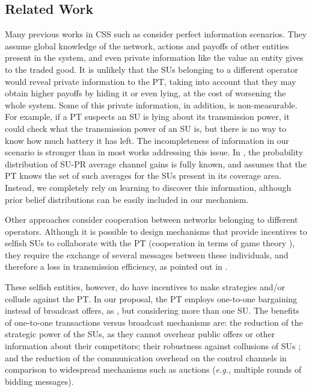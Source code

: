\subsection{Related Work}\label{sec:Rel}
Many previous works in CSS such as \cite{ref:Simeone2008,ref:Zhang2009,ref:Yi2010,ref:Nadkar2011} consider perfect information scenarios. 
They assume global knowledge of the network, actions and payoffs of other entities present in the system, and even private information like the value an entity gives to the traded good.
It is unlikely that the SUs belonging to a different operator would reveal private information to the PT, taking into account that they may obtain higher payoffs by hiding it or even lying, at the cost of worsening the whole system. 
Some of this private information, in addition, is non-measurable. For example, if a PT suspects an SU is lying about its transmission power, it could check what the transmission power of an SU is, but there is no way to know how much battery it has left.
The incompleteness of information in our scenario is stronger than in most works addressing this issue. In \cite{ref:Duan2014}, the probability distribution of SU-PR average channel gains is fully known, and \cite{ref:Feng2014} assumes that the PT knows the set of such averages for the SUs present in its coverage area. Instead, we completely rely on learning to discover this information, although prior belief distributions can be easily included in our mechanism. 

Other approaches \cite{ref:Yuan2013,ref:Han2010,ref:Li2011} consider cooperation between networks belonging to different operators. 
Although it is possible to design mechanisms that provide incentives to selfish SUs to collaborate with the PT (cooperation in terms of game theory \cite{ref:Zhang2012_Fair}), they require the exchange of several messages between these individuals, and therefore a loss in transmission efficiency, as pointed out in \cite{ref:Niyato2008}.

These selfish entities, however, do have incentives to make strategies and/or collude against the PT. 
In our proposal, the PT employs one-to-one bargaining instead of broadcast offers, as \cite{ref:Yan2013}, but considering more than one SU. The benefits of one-to-one transactions versus broadcast mechanisms \cite{ref:Feng2014,ref:Duan2014,ref:Jayaweera2011,ref:Zhang2009,ref:Simeone2008} are: the reduction of the strategic power of the SUs, as they cannot overhear public offers or other information about their competitors; their robustness against collusions of SUs \cite{ref:Alcaraz2014_coa}; and the reduction of the communication overhead on the control channels in comparison to widespread mechanisms such as auctions \cite{ref:Feng2014, ref:Jayaweera2011} (\textit{e.g.,} multiple rounds of bidding messages).
 
